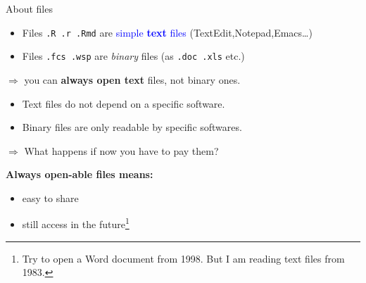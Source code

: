 \documentclass[10pt, xcolor=table]{beamer}
\newcommand{\blue}{\textcolor{blue}}
\begin{document}
\begin{frame}{About files}

  \begin{itemize}
  \item Files \texttt{.R .r .Rmd} are \blue{simple \textbf{text} files}
    (TextEdit,Notepad,Emacs\dots)
  \item Files \texttt{.fcs .wsp} are \emph{binary} files (as \texttt{.doc .xls} etc.)
  \end{itemize}
  \begin{alertblock}{}
    \begin{center}
      $\Longrightarrow$ you can \textbf{always open text} files, not binary ones.
    \end{center}
  \end{alertblock}

  \begin{itemize}
  \item Text files do not depend on a specific software.
  \item Binary files are only readable by specific softwares.
  \end{itemize}

  \begin{exampleblock}{}
    \begin{center}
      $\Longrightarrow$ What happens if now you have to pay them?
    \end{center}
  \end{exampleblock}

  \begin{block}{}
    \centering
    \textbf{Always open-able files means:}
    \begin{itemize}
    \item easy to share
    \item still access in the future\footnote{Try to open a Word document from
      1998. But I am reading text files from 1983.}
    \end{itemize}
  \end{block}
\end{frame}
\end{document}
